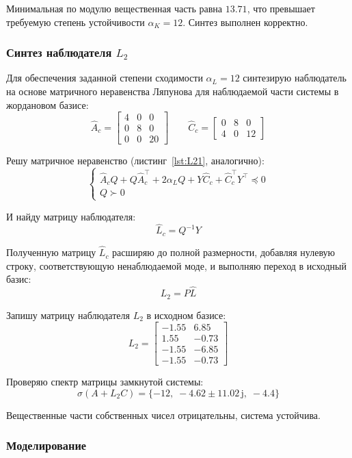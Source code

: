 \documentclass[a4paper,12pt]{article}
\begin{document}
	Минимальная по модулю вещественная часть равна $13.71$, что превышает требуемую степень устойчивости $\alpha_K = 12$. Синтез выполнен корректно.
	
	\subsubsection{Синтез наблюдателя $L_2$}
	
	Для обеспечения заданной степени сходимости $\alpha_L = 12$ синтезирую наблюдатель на основе матричного неравенства Ляпунова для наблюдаемой части системы в жордановом базисе:
	\[
	\hat A_c =
	\begin{bmatrix}
		4 & 0 & 0 \\
		0 & 8 & 0 \\
		0 & 0 & 20
	\end{bmatrix} \qquad
	\hat C_c =
	\begin{bmatrix}
		0 & 8 & 0 \\
		4 & 0 & 12
	\end{bmatrix}
	\]
	
	Решу матричное неравенство (листинг~\ref{lst:L21}, аналогично):
	\[
	\begin{cases}
		\hat A_c Q + Q \hat A_c^\top + 2\alpha_L Q + Y \hat C_c + \hat C_c^\top Y^\top \preceq 0 \\
		Q \succ 0
	\end{cases}
	\]
	
	И найду матрицу наблюдателя:
	\[
	\hat L_c = Q^{-1} Y
	\]
	
	Полученную матрицу $\hat L_c$ расширяю до полной размерности, добавляя нулевую строку, соответствующую ненаблюдаемой моде, и выполняю переход в исходный базис:
	\[
	L_2 = P \hat L
	\]
	
	Запишу матрицу наблюдателя \(L_2\) в исходном базисе:
	\[
	L_2 = \begin{bmatrix}
		-1.55 & 6.85 \\
		1.55 & -0.73 \\
		-1.55 & -6.85 \\
		-1.55 & -0.73
	\end{bmatrix}	
	\]
	
	Проверяю спектр матрицы замкнутой системы:
	\[
	\sigma(A + L_2 C) = \{-12,\; -4.62 \pm 11.02\,\mathrm{j},\; -4.4\}
	\]
	
	Вещественные части собственных чисел отрицательны, система устойчива.
	
	
	\subsubsection{Моделирование}
	
\end{document}
